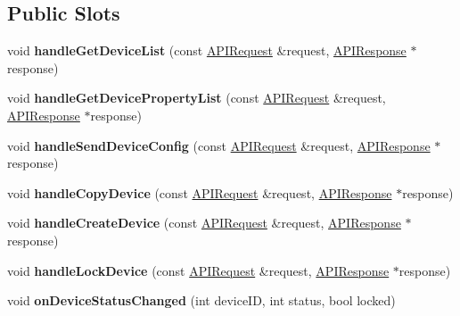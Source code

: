 \subsection*{Public Slots}
\begin{DoxyCompactItemize}
\item 
\mbox{\label{class_a_p_i_device_a1e74a10d605557654fe5be02a9db87ab}} 
void {\bfseries handle\+Get\+Device\+List} (const \hyperlink{class_a_p_i_request}{A\+P\+I\+Request} \&request, \hyperlink{class_a_p_i_response}{A\+P\+I\+Response} $\ast$response)
\item 
\mbox{\label{class_a_p_i_device_a5be87488af611d8ef61501a07e4a39d9}} 
void {\bfseries handle\+Get\+Device\+Property\+List} (const \hyperlink{class_a_p_i_request}{A\+P\+I\+Request} \&request, \hyperlink{class_a_p_i_response}{A\+P\+I\+Response} $\ast$response)
\item 
\mbox{\label{class_a_p_i_device_a794458df71d6f24a8b8dccbbdf9235da}} 
void {\bfseries handle\+Send\+Device\+Config} (const \hyperlink{class_a_p_i_request}{A\+P\+I\+Request} \&request, \hyperlink{class_a_p_i_response}{A\+P\+I\+Response} $\ast$response)
\item 
\mbox{\label{class_a_p_i_device_ab3151ab616a5ae04f1aa157d24e8f511}} 
void {\bfseries handle\+Copy\+Device} (const \hyperlink{class_a_p_i_request}{A\+P\+I\+Request} \&request, \hyperlink{class_a_p_i_response}{A\+P\+I\+Response} $\ast$response)
\item 
\mbox{\label{class_a_p_i_device_aabc5cc49832ebe6779cf70c1b38ad4c9}} 
void {\bfseries handle\+Create\+Device} (const \hyperlink{class_a_p_i_request}{A\+P\+I\+Request} \&request, \hyperlink{class_a_p_i_response}{A\+P\+I\+Response} $\ast$response)
\item 
\mbox{\label{class_a_p_i_device_a9fa95a9f88e738477ed5e32e22ae6990}} 
void {\bfseries handle\+Lock\+Device} (const \hyperlink{class_a_p_i_request}{A\+P\+I\+Request} \&request, \hyperlink{class_a_p_i_response}{A\+P\+I\+Response} $\ast$response)
\item 
\mbox{\label{class_a_p_i_device_a4424a0e2b44177c7b3af3b9fd9aca875}} 
void {\bfseries on\+Device\+Status\+Changed} (int device\+ID, int status, bool locked)
\end{DoxyCompactItemize}

